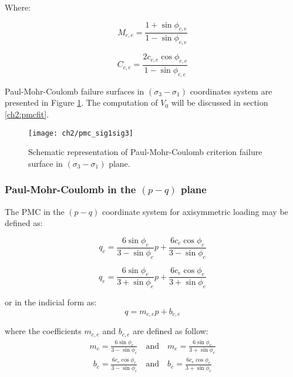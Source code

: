 Where:

\begin{equation}\label{eq2:PMC_sig1sig3_Mce}
    M_{c,e} = \frac{1+\sin \phi_{c,e}}{1-\sin \phi_{c,e}}
\end{equation}

\begin{equation}\label{eq2:PMC_sig1sig3_Cce}
    C_{c,e} = \frac{2c_{c,e}\cos \phi_{c,e}}{1-\sin \phi_{c,e}}
\end{equation}

Paul-Mohr-Coulomb failure surfaces in $(\sigma_3 -\sigma_1)$ coordinates system are presented in Figure \ref{fig2:pmc_sig1sig3}. The computation of $V_0$ will be discussed in section \ref{ch2:pmcfit}. 

\begin{figure}[tb]
    \centering
    \texttt{[image: ch2/pmc\_sig1sig3]}
    \caption{Schematic representation of Paul-Mohr-Coulomb criterion failure surface in $(\sigma_3 -\sigma_1)$ plane.}
    \label{fig2:pmc_sig1sig3}
\end{figure} 

\subsubsection{Paul-Mohr-Coulomb in the \texorpdfstring{$(p-q)$}{p-q} plane}

The PMC in the $(p-q)$ coordinate system for axisymmetric loading may be defined as:

\begin{equation}\label{eq2:pmc-q-CTC}
    q_c=\frac{6 \sin \phi_{c}}{3-\sin \phi_{c}} p+\frac{6 c_{c} \cos \phi_{c}}{3-\sin \phi_{c}}
\end{equation}

\begin{equation}\label{eq2:pmc-q-CTE}
    q_e=\frac{6 \sin \phi_{e}}{3+\sin \phi_{e}} p+\frac{6 c_{e} \cos  \phi_{e}}{3+\sin \phi_{e}}
\end{equation}

or in the indicial form as:
\begin{equation}\label{eq2:PMC_pq}
    q = m_{c,e}p+b_{c,e}
\end{equation}

where the coefficients $m_{c,e}$ and $b_{c,e}$ are defined as follow:
\begin{align}\label{eq2:pmc_m_pq}
    m_c=\frac{6 \sin \phi_{c}}{3-\sin \phi_{c}} \quad \textrm{and} \quad m_e=\frac{6 \sin \phi_{e}}{3+\sin \phi_{e}} 
\end{align}
\begin{align}\label{eq2:pmc_b_pq}
    b_c=\frac{6 c_{c} \cos \phi_{c}}{3-\sin \phi_{c}}\quad \textrm{and} \quad b_e=\frac{6 c_{e} \cos \phi_{e}}{3+\sin \phi_{e}}
\end{align}


